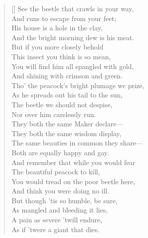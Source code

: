 \clearpage
{}

\begin{verse}[\versewidth]
See the beetle that crawls in your way,\\
\vin And runs to escape from your feet;\\
His house is a hole in the clay,\\
\vin And the bright morning dew is his meat.\\
\bigskip
But if you more closely behold\\
\vin This insect you think is so mean,\\
You will find him all spangled with gold,\\
\vin And shining with crimson and green.\\
\bigskip
Tho' the peacock's bright plumage we prize,\\
\vin As he spreads out his tail to the sun,\\
The beetle we should not despise,\\
\vin Nor over him carelessly run.\\
\bigskip
They both the same Maker declare---\\
\vin They both the same wisdom display,\\
The same beauties in common they share---\\
\vin Both are equally happy and gay.\\
\bigskip
And remember that while you would fear\\
\vin The beautiful peacock to kill,\\
You would tread on the poor beetle here,\\
\vin And think you were doing no ill.\\
\bigskip
But though 'tis so humble, be sure,\\
\vin As mangled and bleeding it lies,\\
A pain as severe 'twill endure,\\
\vin As if 'twere a giant that dies.\\
\end{verse}

